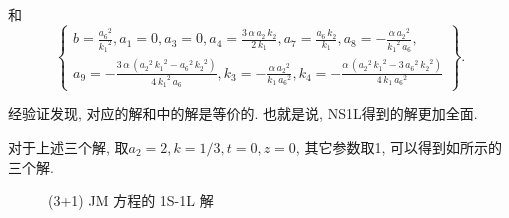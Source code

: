 和
\begin{equation}
\renewcommand{\arraystretch}{1.2}
\left\{
\begin{array}{l}  
b=\frac{{{{a}_{6}}}^{2}}{{{{k}_{1}}}^{2}},
{{a}_{1}}=0,
{{a}_{3}}=0,
{{a}_{4}}=\frac{3\,\alpha\,{{a}_{2}}\,{{k}_{2}}}{2\,{{k}_{1}}},
{{a}_{7}}=\frac{{{a}_{6}}\,{{k}_{2}}}{{{k}_{1}}},
{{a}_{8}}=-\frac{\alpha\,{{{a}_{2}}}^{2}}{{{{k}_{1}}}^{2}\,{{a}_{6}}},\\
{{a}_{9}}=-\frac{3\,\alpha\,\left( {{{a}_{2}}}^{2}\,{{{k}_{1}}}^{2}-{{{a}_{6}}}^{2}\,{{{k}_{2}}}^{2}\right) }{4\,{{{k}_{1}}}^{2}\,{{a}_{6}}},
{{k}_{3}}=-\frac{\alpha\,{{{a}_{2}}}^{2}}{{{k}_{1}}\,{{{a}_{6}}}^{2}},
{{k}_{4}}=-\frac{\alpha\,\left( {{{a}_{2}}}^{2}\,{{{k}_{1}}}^{2}-3\,{{{a}_{6}}}^{2}\,{{{k}_{2}}}^{2}\right) }{4\,{{k}_{1}}\,{{{a}_{6}}}^{2}}
\end{array}
\right\}. \label{1S1L-3}
\end{equation}

经验证发现, 对应的解和中的解是等价的. 也就是说, NS1L得到的解更加全面. 

对于上述三个解, 取$a_2=2,k=1/3,t=0,z=0$, 其它参数取1, 可以得到如所示的三个解. 

\begin{figure}[htbp]
\centering
{}
\caption{(3+1) JM 方程的 1S-1L 解} \label{fig-1S1L}
\end{figure}

